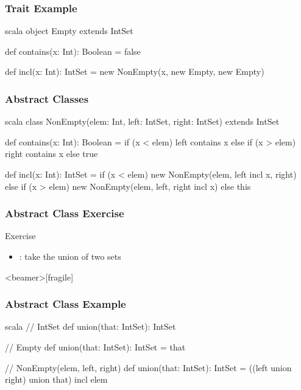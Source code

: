 \documentclass[dvipsnames]{beamer}
\theoremstyle{plain}
\begin{document}
\begin{frame}[fragile]
  \frametitle{Trait Example}

  \begin{example}[Scala]
    \begin{pygments}{scala}
object Empty extends IntSet {
    def contains(x: Int): Boolean = false

    def incl(x: Int): IntSet =
        new NonEmpty(x, new Empty, new Empty)
}
    \end{pygments}
  \end{example}
\end{frame}

\begin{frame}[fragile]
  \frametitle{Abstract Classes}

  \begin{example}[Scala]
    \begin{pygments}{scala}
class NonEmpty(elem: Int, left: IntSet,
               right: IntSet) extends IntSet {
    def contains(x: Int): Boolean =
        if (x < elem) left contains x
        else if (x > elem) right contains x
        else true

    def incl(x: Int): IntSet =
         if (x < elem)
            new NonEmpty(elem, left incl x, right)
         else if (x > elem)
            new NonEmpty(elem, left, right incl x)
         else this
}
    \end{pygments}
  \end{example}
\end{frame}

\begin{frame}
  \frametitle{Abstract Class Exercise}

  \begin{block}{Exercise}
    \begin{itemize}
      \item {}: take the union of two sets
    \end{itemize}
  \end{block}
\end{frame}

\begin{frame}<beamer>[fragile]
  \frametitle{Abstract Class Example}

  \begin{example}[Scala]
    \begin{pygments}{scala}
// IntSet
def union(that: IntSet): IntSet

// Empty
def union(that: IntSet): IntSet = that

// NonEmpty(elem, left, right)
def union(that: IntSet): IntSet =
    ((left union right) union that) incl elem
    \end{pygments}
  \end{example}
\end{frame}
\end{document}
